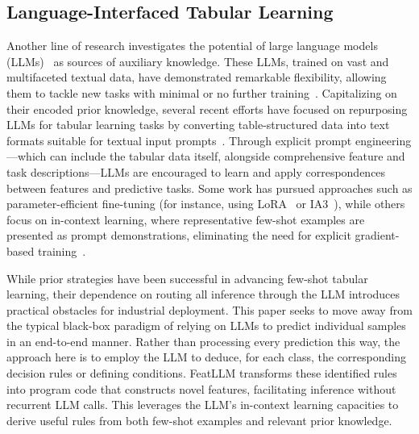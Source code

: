 \subsection{Language-Interfaced Tabular Learning} Another line of research investigates the potential of large language models (LLMs)~\cite{anil2023palm,openai2023gpt4} as sources of auxiliary knowledge. These LLMs, trained on vast and multifaceted textual data, have demonstrated remarkable flexibility, allowing them to tackle new tasks with minimal or no further training~\cite{brown2020language}. Capitalizing on their encoded prior knowledge, several recent efforts have focused on repurposing LLMs for tabular learning tasks by converting table-structured data into text formats suitable for textual input prompts~\cite{dinh2022lift,hegselmann2023tabllm,wang2023anypredict}. Through explicit prompt engineering—which can include the tabular data itself, alongside comprehensive feature and task descriptions—LLMs are encouraged to learn and apply correspondences between features and predictive tasks. Some work has pursued approaches such as parameter-efficient fine-tuning (for instance, using LoRA~\cite{hu2021lora} or IA3~\cite{liu2022few}), while others focus on in-context learning, where representative few-shot examples are presented as prompt demonstrations, eliminating the need for explicit gradient-based training~\cite{dinh2022lift,hegselmann2023tabllm,nam2023semi,slack2023tablet}.

While prior strategies have been successful in advancing few-shot tabular learning, their dependence on routing all inference through the LLM introduces practical obstacles for industrial deployment. This paper seeks to move away from the typical black-box paradigm of relying on LLMs to predict individual samples in an end-to-end manner. Rather than processing every prediction this way, the approach here is to employ the LLM to deduce, for each class, the corresponding decision rules or defining conditions. \textsf{FeatLLM} transforms these identified rules into program code that constructs novel features, facilitating inference without recurrent LLM calls. This leverages the LLM's in-context learning capacities to derive useful rules from both few-shot examples and relevant prior knowledge.

